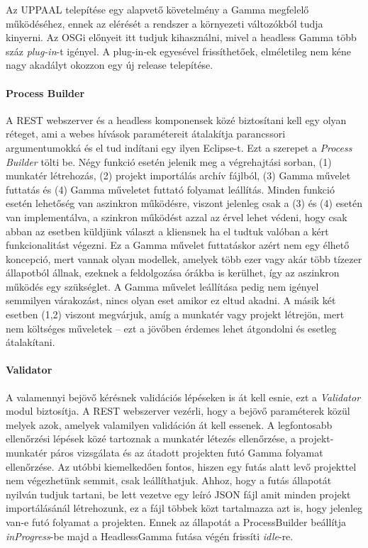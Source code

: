 Az UPPAAL telepítése egy alapvető követelmény a Gamma megfelelő működéséhez, ennek az elérését a rendszer a környezeti változókból tudja kinyerni.
Az OSGi előnyeit itt tudjuk kihasználni, mivel a headless Gamma több száz \textit{plug-in}-t igényel. A plug-in-ek egyesével frissíthetőek, elméletileg nem kéne nagy akadályt okozzon egy új release telepítése.

\paragraph{Process Builder} A REST webszerver és a headless komponensek közé biztosítani kell egy olyan réteget, ami a webes hívások paramétereit átalakítja parancssori argumentumokká és el tud indítani egy ilyen Eclipse-t. Ezt a szerepet a \textit{Process Builder} tölti be. Négy funkció esetén jelenik meg a végrehajtási sorban, (1) munkatér létrehozás, (2) projekt importálás archív fájlból, (3) Gamma művelet futtatás és (4) Gamma műveletet futtató folyamat leállítás. Minden funkció esetén lehetőség van aszinkron működésre, viszont jelenleg csak a (3) és (4) esetén van implementálva,  a szinkron működést azzal az érvel lehet védeni, hogy csak abban az esetben küldjünk választ a kliensnek ha el tudtuk valóban a kért funkcionalitást végezni. Ez a Gamma művelet futtatáskor azért nem egy élhető koncepció, mert vannak olyan modellek, amelyek több ezer vagy akár több tízezer állapotból állnak, ezeknek a feldolgozása órákba is kerülhet, így az aszinkron működés egy szükséglet. A Gamma művelet leállítása pedig nem igényel semmilyen várakozást, nincs olyan eset amikor ez eltud akadni. A másik két esetben (1,2) viszont megvárjuk, amíg a munkatér vagy projekt létrejön, mert nem költséges műveletek -- ezt a jövőben érdemes lehet átgondolni és esetleg átalakítani.

\paragraph{Validator} A valamennyi bejövő kérésnek validációs lépéseken is át kell esnie, ezt a \textit{Validator} modul biztosítja. A REST webszerver vezérli, hogy a bejövő paraméterek közül melyek azok, amelyek valamilyen validáción át kell essenek. A legfontosabb ellenőrzési lépések közé tartoznak a munkatér létezés ellenőrzése, a projekt-munkatér páros vizsgálata és az átadott projekten futó Gamma folyamat ellenőrzése. Az utóbbi kiemelkedően fontos, hiszen egy futás alatt levő projekttel nem végezhetünk semmit, csak leállíthatjuk. Ahhoz, hogy a futás állapotát nyilván tudjuk tartani, be lett vezetve egy leíró JSON fájl amit minden projekt importálásánál létrehozunk, ez a fájl többek közt tartalmazza azt is, hogy jelenleg van-e futó folyamat a projekten. Ennek az állapotát a ProcessBuilder beállítja \textit{inProgress}-be majd a HeadlessGamma futása végén frissíti \textit{idle}-re.
